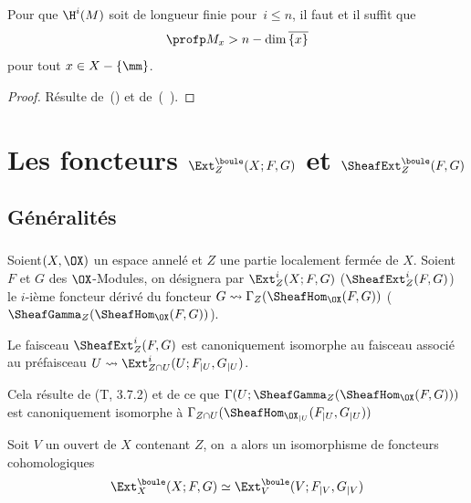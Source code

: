 \begin{corollaire} \label{V.3.6} Pour que $\H^{i}(M)$ soit de longueur finie pour~$i\leq n$, il faut et il suffit que
$$
\profp M_{x}>n-\dim\overline{\{ x\} }$$
pour tout $x\in X-\{ \mm\}$.
\end{corollaire}

\begin{proof}
R\'esulte de~() et de~(~).
\skipqed
\end{proof}

\chapter{Les foncteurs $\protect\Ext^{\protect\boule}_Z(X;F, G)$ et $\protect\SheafExt^{\protect\boule}_Z(F, G)$} \label{VI}


\section{G\'en\'eralit\'es} \label{VI.1}
\enlargethispage{\baselineskip}%
\subsection{} \label{VI.1.1}
Soient\pageoriginale $(X, \OX)$ un espace annel\'e et $Z$ une partie localement ferm\'ee de $X$. Soient $F$ et $G$ des $\OX$-Modules, on d\'esignera par ${\Ext_Z^i}(X;F, G)$ (\resp ${\SheafExt_Z^i}(F, G)$) le $i$-i\`eme foncteur d\'eriv\'e du foncteur $G \rightsquigarrow \Gamma_Z(\SheafHom_{\OX}(F, G))$ (\resp $\SheafGamma_Z(\SheafHom_{\OX}(F, G))$).

\begin{lemme} \label{VI.1.2}
Le faisceau ${\SheafExt_Z^i}(F, G)$ est canoniquement isomorphe au faisceau associ\'e au pr\'efaisceau $U\rightsquigarrow {\Ext_{Z\cap U}^i}(U;F_{|U}, G_{|U})$.
\end{lemme}

Cela r\'esulte de (T, 3.7.2) et de ce que $\Gamma(U;\SheafGamma_Z(\SheafHom_{\OX}(F, G)))$ est canoniquement isomorphe \`a $\Gamma_{Z\cap U}(\SheafHom_{{\OX}_{|U}}(F_{|U}, G_{|U}))$

\begin{theoreme} \label{VI.1.3}
Soit $V$ un ouvert de $X$ contenant $Z$, on~a alors un isomorphisme de foncteurs cohomologiques
\begin{equation} \label{VI.1.3.1}
\Ext_{X}^{\boule}(X;F, G) \simeq \Ext_{V}^{\boule}(V;F_{|V}, G_{|V})
\end{equation}
\end{theoreme}

